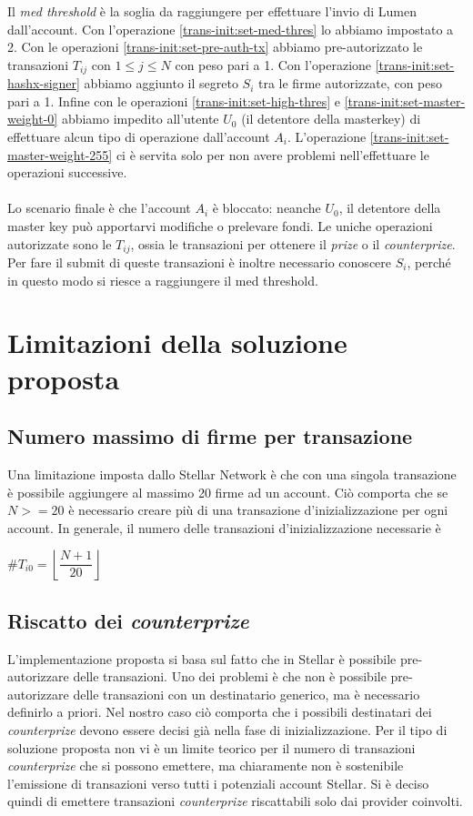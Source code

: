 Il \textit{med threshold} è la soglia da raggiungere per effettuare
l'invio di Lumen dall'account.
Con l'operazione \ref{trans-init:set-med-thres} lo abbiamo impostato a 2.
Con le operazioni \ref{trans-init:set-pre-auth-tx} abbiamo pre-autorizzato
le transazioni
$ T_{ij} $ con $ 1 \leq j \leq N $ con peso pari a 1.
Con l'operazione \ref{trans-init:set-hashx-signer} abbiamo aggiunto il segreto
$ S_i $ tra le firme autorizzate, con peso pari a 1.
Infine con le operazioni \ref{trans-init:set-high-thres} e
\ref{trans-init:set-master-weight-0} abbiamo impedito all'utente $ U_0 $ (il
detentore della masterkey) di effettuare alcun tipo di operazione dall'account $ A_i $.
L'operazione \ref{trans-init:set-master-weight-255} ci è servita solo per
non avere problemi
nell'effettuare le operazioni successive.
\\
\\
Lo scenario finale è che l'account $ A_i $ è bloccato: neanche $ U_0 $, il detentore
della master key può apportarvi modifiche o prelevare fondi. Le uniche operazioni
autorizzate sono le $ T_{ij} $, ossia le transazioni per ottenere il \textit{prize}
o il \textit{counterprize}. Per fare il submit di queste transazioni è inoltre
necessario conoscere $ S_i $, perché in questo modo si riesce a raggiungere
il med threshold.

\section{Limitazioni della soluzione proposta}

\subsection{Numero massimo di firme per transazione}
Una limitazione imposta dallo Stellar Network è che con
una singola transazione è possibile aggiungere al massimo 20 firme ad un account.
Ciò comporta che se $ N >= 20 $ è necessario creare più di una transazione
d'inizializzazione per ogni account.
In generale, il numero delle transazioni d'inizializzazione necessarie è
\begin{center}
	$ \# T_{i0} = \left\lfloor\dfrac{ N + 1 }{ 20 }\right\rfloor $
\end{center}

\subsection{Riscatto dei \textit{counterprize}}
L'implementazione proposta si basa sul fatto che in Stellar è possibile pre-autorizzare
delle transazioni. Uno dei problemi è che non è possibile pre-autorizzare delle transazioni con
un destinatario generico, ma è necessario definirlo a priori. Nel nostro caso ciò comporta che
i possibili destinatari dei \textit{counterprize} devono essere decisi già nella
fase di inizializzazione. Per il tipo di soluzione proposta non vi è un limite teorico
per il numero di transazioni \textit{counterprize} che si possono emettere, ma chiaramente
non è sostenibile l'emissione di transazioni verso tutti i potenziali account Stellar.
Si è deciso quindi di emettere transazioni \textit{counterprize} riscattabili solo dai
provider coinvolti.

